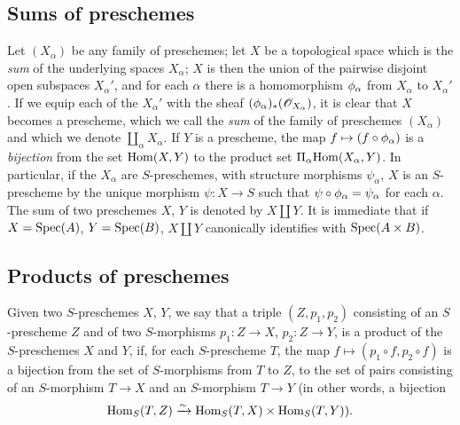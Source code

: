 \subsection{Sums of preschemes}
\label{subsection-sums-of-preschemes}

Let $(X_\alpha)$ be any family of preschemes; let $X$ be a topological space which is the
{\em sum} of the underlying spaces $X_\alpha$; $X$ is then the union of the pairwise
disjoint open subspaces $X_\alpha'$, and for each $\alpha$ there is a homomorphism
$\phi_\alpha$ from $X_\alpha$ to $X_\alpha'$. If we equip each of the $X_\alpha'$ with the
sheaf $(\phi_\alpha)_*(\mathscr{O}_{X_\alpha})$, it is clear that $X$ becomes a prescheme, which
we call the {\em sum} of the family of preschemes $(X_\alpha)$ and which we denote
$\amalg_\alpha X_\alpha$. If $Y$ is a prescheme, the map $f\mapsto(f\circ\phi_\alpha)$ is a
{\em bijection} from the set ${\mathop{\mathrm{Hom}}\nolimits}(X,Y)$ to the product set $\Pi_\alpha{\mathop{\mathrm{Hom}}\nolimits}(X_\alpha,Y)$.
In particular, if the $X_\alpha$ are $S$-preschemes, with structure morphisms $\psi_\alpha$,
$X$ is an $S$-prescheme by the unique morphism $\psi:X\to S$ such that
$\psi\circ\phi_\alpha=\psi_\alpha$ for each $\alpha$. The sum of two preschemes $X$, $Y$ is
denoted by $X\amalg Y$. It is immediate that if $X={\mathop{\mathrm{Spec}}\nolimits}(A)$, $Y={\mathop{\mathrm{Spec}}\nolimits}(B)$, $X\amalg Y$
canonically identifies with ${\mathop{\mathrm{Spec}}\nolimits}(A\times B)$.

\subsection{Products of preschemes}
\label{subsection-products-of-preschemes}

\begin{defn}[3.2.1]
\label{defn-1.3.2.1}
Given two $S$-preschemes $X$, $Y$, we say that a triple $(Z,p_1,p_2)$ consisting of an
$S$-prescheme $Z$ and of two $S$-morphisms $p_1:Z\to X$, $p_2:Z\to Y$, is a product of the
$S$-preschemes $X$ and $Y$, if, for each $S$-prescheme $T$, the map
$f\mapsto(p_1\circ f,p_2\circ f)$ is a bijection from the set of $S$-morphisms from $T$ to
$Z$, to the set of pairs consisting of an $S$-morphism $T\to X$ and an $S$-morphism $T\to Y$
(in other words, a bijection
\[
  {\mathop{\mathrm{Hom}}\nolimits}_S(T,Z)\xrightarrow{\sim}{\mathop{\mathrm{Hom}}\nolimits}_S(T,X)\times{\mathop{\mathrm{Hom}}\nolimits}_S(T,Y)).
\]
\end{defn}

